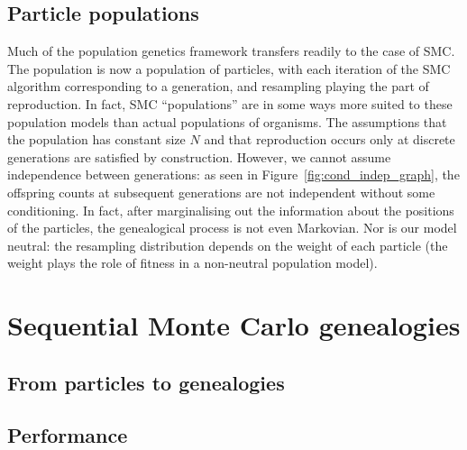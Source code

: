 \subsection{Particle populations \seb{$\checkmark$} }
Much of the population genetics framework transfers readily to the case of SMC. The population is now a population of particles, with each iteration of the SMC algorithm corresponding to a generation, and resampling playing the part of reproduction.
In fact, SMC ``populations'' are in some ways more suited to these population models than actual populations of organisms.
The assumptions that the population has constant size $N$ and that reproduction occurs only at discrete generations are satisfied by construction.
However, we cannot assume independence between generations: as seen in Figure~\ref{fig:cond_indep_graph}, the offspring counts at subsequent generations are not independent without some conditioning. In fact, after marginalising out the information about the positions of the particles, the genealogical process is not even Markovian.
Nor is our model neutral: the resampling distribution depends on the weight of each particle (the weight plays the role of fitness in a non-neutral population model).






\section{Sequential Monte Carlo genealogies}

\subsection{From particles to genealogies}

\subsection{Performance}

